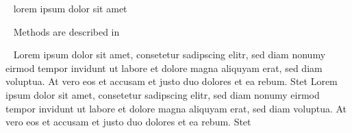 



\vspace{-\baselineskip} %

\setcounter{figure}{0}
\setcounter{table}{0}







\label{C1:introduction} %
\ %
lorem ipsum dolor sit amet


\ %
Methods are described in 



\ %
Lorem ipsum dolor sit amet, consetetur sadipscing elitr, sed diam nonumy
eirmod tempor invidunt ut labore et dolore magna aliquyam erat, sed diam
voluptua. At vero eos et accusam et justo duo dolores et ea rebum. Stet
Lorem ipsum dolor sit amet, consetetur sadipscing elitr, sed diam nonumy
eirmod tempor invidunt ut labore et dolore magna aliquyam erat, sed diam
voluptua. At vero eos et accusam et justo duo dolores et ea rebum. Stet

